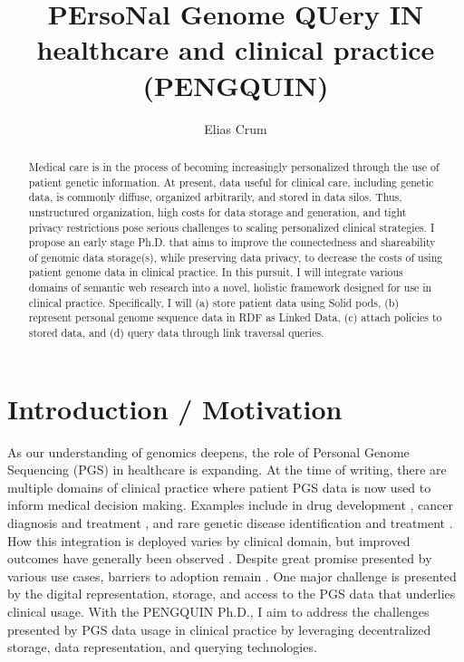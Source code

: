 \documentclass[runningheads]{llncs}
\begin{document}
\title{PErsoNal Genome QUery IN healthcare and clinical practice (PENGQUIN)}

\author{Elias Crum}



\maketitle

\begin{abstract}
    Medical care is in the process of becoming increasingly personalized through the use of patient genetic information. 
    At present, data useful for clinical care, including genetic data, is commonly diffuse, organized arbitrarily, and stored in data silos. 
    Thus, unstructured organization, high costs for data storage and generation, and tight privacy restrictions pose serious challenges to scaling personalized clinical strategies.
    I propose an early stage Ph.D. that aims to improve the connectedness and shareability of genomic data storage(s), while preserving data privacy, to decrease the costs of using patient genome data in clinical practice. 
    In this pursuit, I will integrate various domains of semantic web research into a novel, holistic framework designed for use in clinical practice.
    Specifically, I will (a) store patient data using Solid pods, (b) represent personal genome sequence data in RDF as Linked Data, (c) attach policies to stored data, and (d) query data through link traversal queries.


\end{abstract}


\section{Introduction / Motivation}
As our understanding of genomics deepens, the role of Personal Genome Sequencing (PGS) in healthcare is expanding. 
At the time of writing, there are multiple domains of clinical practice where patient PGS data is now used to inform medical decision making. 
Examples include in drug development \cite{ko_new_2022}, cancer diagnosis and treatment \cite{mcleod_cancer_2013}, and rare genetic disease identification and treatment \cite{marwaha_guide_2022}.
How this integration is deployed varies by clinical domain, but improved outcomes have generally been observed \cite{mathur_personalized_2017}.
Despite great promise presented by various use cases, barriers to adoption remain \cite{stefanicka-wojtas_barriers_2023}. 
One major challenge is presented by the digital representation, storage, and access to the PGS data that underlies clinical usage.
With the PENGQUIN Ph.D., I aim to address the challenges presented by PGS data usage in clinical practice by leveraging  decentralized storage, data representation, and querying technologies.
\end{document}
